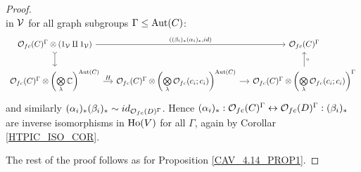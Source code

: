 \documentclass[a4paper,10pt
,draft
]{article}%
\renewcommand{\1}{\eta}%
\begin{document}
\begin{proof}
\begin{equation}
      \end{equation}
      in $\mathcal V$ for all graph subgroups $\Gamma \leq \operatorname{Aut}(C)$:
      \begin{equation}
            \begin{tikzcd}[column sep = small]
                  \O_{f c}(C)^\Gamma \otimes (1_\V \amalg 1_\V) \arrow[d, tail] \arrow[rr, "{((\beta_i)_{\**}(\alpha_i)_{\**}, id)}"]
                  &&
                  \O_{f c}(C)^\Gamma
                  \\                  
                  \O_{f c}(C)^\Gamma \otimes \left(\bigotimes\limits_\lambda \mathbb C\right)^{\Aut(C)}
                  \arrow[r, "H"]
                  &
                  \O_{f c}(C)^\Gamma \otimes \left(\bigotimes\limits_\lambda \O_{f c}(c_i;c_i)\right)^{\Aut(C)} \arrow[r]
                  &
                  \O_{f c}(C)^\Gamma \otimes \left(\bigotimes\limits_\lambda \O_{f c}(c_i;c_i)\right)^{\Gamma} \arrow[u, "\circ"']
            \end{tikzcd}
      \end{equation}
      and similarly $(\alpha_i)_{\**}(\beta_i)_{\**} \sim id_{\O_{f c}(D)^\Gamma}$.
      Hence
      $(\alpha_i)_{\**}: \O_{f c}(C)^\Gamma \leftrightarrow \O_{f c}(D)^\Gamma: (\beta_i)_{\**}$
      are inverse isomorphisms in $\operatorname{Ho}(V)$ for all $\Gamma$, again by Corollar \ref{HTPIC_ISO_COR}.

      The rest of the proof follows as for Proposition \ref{CAV_4.14_PROP1}.
      

\end{proof}
\end{document}
